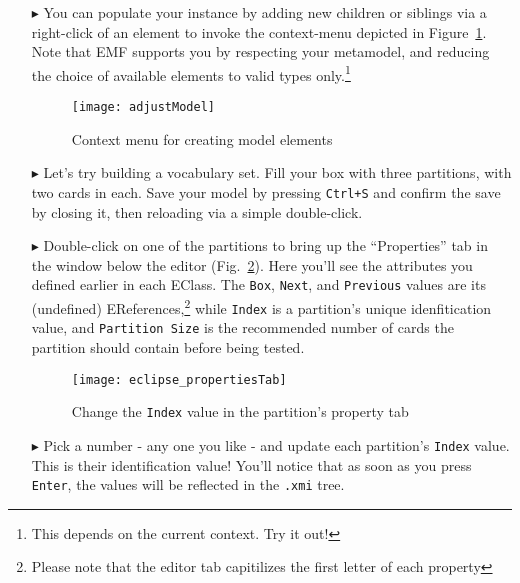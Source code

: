 \begin{itemize}
\clearpage

\item[$\blacktriangleright$] You can populate your instance by adding new children or siblings via a right-click of an element to invoke the
context-menu depicted in Figure~\ref{eclipse:create_instance}. Note that EMF supports you by respecting your metamodel, and reducing the choice of available
elements to valid types only.\footnote{This depends on the current context. Try it out!}

\begin{figure}[htbp]
	\centering
  \texttt{[image: adjustModel]}
	\caption{Context menu for creating model elements}
	\label{eclipse:create_instance}
\end{figure}

\item[$\blacktriangleright$] Let's try building a vocabulary set. Fill your box with three partitions, with two cards in each. Save your model by pressing
\texttt{Ctrl+S} and confirm the save by closing it, then reloading via a simple double-click.

\item[$\blacktriangleright$] Double-click on one of the partitions to bring up the ``Properties'' tab in the window below the editor
(Fig.~\ref{eclipse:properties_partition}). Here you'll see the attributes you defined earlier in each EClass. The \texttt{Box}, \texttt{Next}, and
\texttt{Previous} values are its (undefined) EReferences,\footnote{Please note that the editor tab capitilizes the first letter of each property} while \texttt{Index} is a
partition's unique idenfitication value, and \texttt{Partition Size} is the recommended number of cards the partition should contain before being tested.

\begin{figure}[h]
	\centering
  \texttt{[image: eclipse\_propertiesTab]}
	\caption{Change the \texttt{Index} value in the partition's property tab}
	\label{eclipse:properties_partition}
\end{figure}
\FloatBarrier

\vspace{0.5cm}

\item[$\blacktriangleright$] Pick a number - any one you like - and update each partition's \texttt{Index} value. This is their identification value! You'll
notice that as soon as you press \texttt{Enter}, the values will be reflected in the \texttt{.xmi} tree.


\end{itemize}
